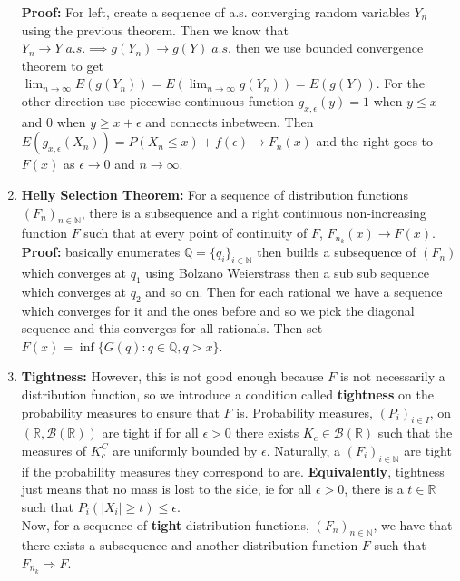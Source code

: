 \documentclass{article}
\begin{document}
\begin{enumerate}
    \textbf{Proof:} For left, create a sequence of a.s. converging random variables \(Y_n\) using the previous theorem. Then we know that \(Y_n \to Y \; a.s. \implies g(Y_n)  \to g(Y) \; a.s.\) then we use bounded convergence theorem to get \(\lim_{n \to \infty}E(g(Y_n)) = E(\lim_{n \to \infty}g(Y_n)) = E(g(Y))\). For the other direction use piecewise continuous function \(g_{x, \epsilon}(y) = 1\) when \(y \leq x\) and 0 when \(y \geq x+ \epsilon\) and connects inbetween. Then \(E(g_{x, \epsilon}(X_n)) = P(X_n\leq x) + f(\epsilon) \to F_n(x)\) and the right goes to \(F(x)\) as \(\epsilon\to 0\) and \(n \to \infty\).

    \item \textbf{Helly Selection Theorem:} For a sequence of distribution functions \((F_n)_{n\in \mathbb{N}}\), there is a subsequence and a right continuous non-increasing function \(F\) such that at every point of continuity of \(F\), \(F_{n_k}(x) \to F(x)\). \\

    \textbf{Proof:} basically enumerates \(\mathbb{Q} = \{q_i\}_{i \in \mathbb{N}}\) then builds a subsequence of \((F_n)\) which converges at \(q_1\) using Bolzano Weierstrass then a sub sub sequence which converges at \(q_2\) and so on. Then for each rational we have a sequence which converges for it and the ones before and so we pick the diagonal sequence and this converges for all rationals. Then set \(F(x) = \inf\{G(q):q \in \mathbb{Q}, q>x\}\).
    
    \item \textbf{Tightness:} However, this is not good enough because \(F\) is not necessarily a distribution function, so we introduce a condition called \textbf{tightness} on the probability measures to ensure that \(F\) is. Probability measures, \((P_i)_{i \in I}\), on \((\mathbb{R}, \mathcal{B}(\mathbb{R}))\) are tight if for all \(\epsilon > 0\) there exists \(K_c \in \mathcal{B}(\mathbb{R})\) such that the measures of \(K_c^C\) are uniformly bounded by \(\epsilon\). Naturally, a \((F_i)_{i \in \mathbb{N}}\) are tight if the probability measures they correspond to are. \textbf{Equivalently}, tightness just means that no mass is lost to the side, ie for all \(\epsilon > 0 \), there is a \(t \in \mathbb{R}\) such that \(P_i(|X_i|\geq t) \leq \epsilon \).\\

    Now, for a sequence of \textbf{tight} distribution functions, \((F_n)_{n\in\mathbb{N}}\), we have that there exists a subsequence and another distribution function \(F\) such that \(F_{n_k}\Rightarrow F\).


\end{enumerate}
\end{document}
